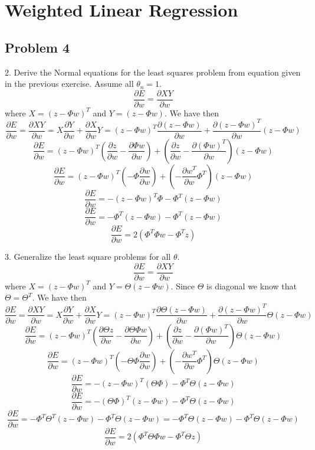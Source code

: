 \section{Weighted Linear Regression}


\subsection*{Problem 4}

2. Derive the Normal equations for the least squares problem from equation given
in the previous exercise. Assume
all $\theta_{n}=1$.
\[
\frac{\partial E}{\partial w}=\frac{\partial XY}{\partial w}
\]
where $X=\left(z-\Phi w\right)^{T}$ and $Y=\left(z-\Phi w\right)$.
We have then
\[
\frac{\partial E}{\partial w}=\frac{\partial XY}{\partial w}=X\frac{\partial
Y}{\partial w}+\frac{\partial X}{\partial w}Y=\left(z-\Phi
w\right)^{T}\frac{\partial\left(z-\Phi w\right)}{\partial
w}+\frac{\partial\left(z-\Phi w\right)^{T}}{\partial w}\left(z-\Phi w\right)
\]
\[
\frac{\partial E}{\partial w}=\left(z-\Phi w\right)^{T}\left(\frac{\partial
z}{\partial w}-\frac{\partial\Phi w}{\partial w}\right)+\left(\frac{\partial
z}{\partial w}-\frac{\partial(\Phi w)^{T}}{\partial w}\right)\left(z-\Phi
w\right)
\]
\[
\frac{\partial E}{\partial w}=\left(z-\Phi w\right)^{T}\left(-\Phi\frac{\partial
w}{\partial w}\right)+\left(-\frac{\partial w{}^{T}}{\partial
w}\Phi^{T}\right)\left(z-\Phi w\right)
\]
\[
\frac{\partial E}{\partial w}=-\left(z-\Phi
w\right)^{T}\Phi-\Phi^{T}\left(z-\Phi w\right)
\]
\[
\frac{\partial E}{\partial w}=-\Phi^{T}\left(z-\Phi
w\right)-\Phi^{T}\left(z-\Phi w\right)
\]
\[
\frac{\partial E}{\partial w}=2\left(\Phi^{T}\Phi w-\Phi^{T}z\right)
\]


3. Generalize the least square problems for all $\theta$.
\[
\frac{\partial E}{\partial w}=\frac{\partial XY}{\partial w}
\]
where $X=\left(z-\Phi w\right)^{T}$ and $Y=\Theta\left(z-\Phi w\right)$.
Since $\Theta$ is diagonal we know that $\Theta=\Theta^{T}$. We
have then
\[
\frac{\partial E}{\partial w}=\frac{\partial XY}{\partial w}=X\frac{\partial
Y}{\partial w}+\frac{\partial X}{\partial w}Y=\left(z-\Phi
w\right)^{T}\frac{\partial\Theta\left(z-\Phi w\right)}{\partial
w}+\frac{\partial\left(z-\Phi w\right)^{T}}{\partial w}\Theta\left(z-\Phi
w\right)
\]
\[
\frac{\partial E}{\partial w}=\left(z-\Phi
w\right)^{T}\left(\frac{\partial\Theta z}{\partial w}-\frac{\partial\Theta\Phi
w}{\partial w}\right)+\left(\frac{\partial z}{\partial w}-\frac{\partial(\Phi
w)^{T}}{\partial w}\right)\Theta\left(z-\Phi w\right)
\]
\[
\frac{\partial E}{\partial w}=\left(z-\Phi
w\right)^{T}\left(-\Theta\Phi\frac{\partial w}{\partial
w}\right)+\left(-\frac{\partial w{}^{T}}{\partial
w}\Phi^{T}\right)\Theta\left(z-\Phi w\right)
\]
\[
\frac{\partial E}{\partial w}=-\left(z-\Phi
w\right)^{T}\left(\Theta\Phi\right)-\Phi^{T}\Theta\left(z-\Phi w\right)
\]
\[
\frac{\partial E}{\partial w}=-\left(\Theta\Phi\right)^{T}\left(z-\Phi
w\right)-\Phi^{T}\Theta\left(z-\Phi w\right)
\]
\[
\frac{\partial E}{\partial w}=-\Phi^{T}\Theta^{T}\left(z-\Phi
w\right)-\Phi^{T}\Theta\left(z-\Phi w\right)=-\Phi^{T}\Theta\left(z-\Phi
w\right)-\Phi^{T}\Theta\left(z-\Phi w\right)
\]
\[
\frac{\partial E}{\partial w}=2\left(\Phi^{T}\Theta\Phi w-\Phi^{T}\Theta
z\right)
\] 
